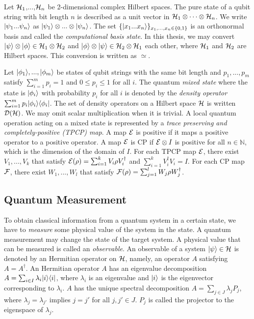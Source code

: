 Let $\mathcal{H}_1$,...,$\mathcal{H}_n$ be 2-dimensional complex Hilbert spaces.
The pure state of a qubit string with bit length $n$ is described as a
unit vector in $\mathcal{H}_1 \otimes \cdots \otimes \mathcal{H}_n$.
We write $|\psi_1...\psi_n\rangle$ as $|\psi_1\rangle \otimes...\otimes
|\psi_n\rangle$.
The set $\{|x_1...x_n\rangle\}_{x_1,...,x_n \in \{0,1\}}$ is 
an orthonormal basis and
called the \emph{computational basis state}.
In this thesis, we may convert
$|\psi\rangle \otimes |\phi\rangle \in \mathcal{H}_1 \otimes \mathcal{H}_2$ and 
$|\phi\rangle \otimes |\psi\rangle \in \mathcal{H}_2 \otimes \mathcal{H}_1$ each other,
where $\mathcal{H}_1$ and
$\mathcal{H}_2$ are Hilbert spaces. This conversion is written as $\simeq$.

Let $|\phi_1\rangle,...,|\phi_m\rangle$ be states of qubit strings with the
same bit length and $p_1,...,p_m$ satisfy $\sum_{i=1}^{m}p_i = 1$
and $0 \le p_i \le 1$ for all $i$. The quantum {\it mixed state} where the
state is $|\phi_i\rangle$ with probability $p_i$ for all $i$ is
denoted by the {\it density operator} $\sum_{i=1}^m
p_i|\phi_i\rangle\langle \phi_i|$. The set of density operators on 
a Hilbert space $\mathcal{H}$ is written $\mathcal{D}(\mathcal{H})$.
We may omit scalar multiplication when it is trivial.
A local quantum 
operation acting on a mixed state is represented by a 
\emph{trace preserving and completely-positive (TPCP) map}.
A map $\mathcal{E}$ is positive if it maps a positive operator to a
positive operator.
A map $\mathcal{E}$ is CP if $\mathcal{E} \otimes I$ is positive
for all $n \in \mathbb{N}$, which is the dimension of the domain of $I$.
For each TPCP map $\mathcal{E}$,
there exist $V_1,...,V_k$ that satisfy $\mathcal{E}(\rho) = \sum_{i=1}^{k} V_i
\rho V_i^\dagger$ and $\sum_{i=1}^{k}V_i^\dagger V_i =I$.
For each CP map $\mathcal{F}$,
there exist $W_1,...,W_l$ that satisfy $\mathcal{F}(\rho) = \sum_{j=1}^{l} W_j
\rho W_j^\dagger$.

\subsection*{Quantum Measurement}
To obtain classical information from a quantum system in a certain state,
we have to
\emph{measure} some physical value of the system in the state. A quantum
measurement may change the state of the target system.
A physical value that can be measured is called an \emph{observable}.
An observable of a system $|\psi\rangle \in \mathcal{H}$
is denoted by an Hermitian operator on $\mathcal{H}$, namely,
an operator $A$ satisfying $A = A^\dagger$.
An Hermitian operator $A$ has an eigenvalue decomposition
$A = \sum_{i \in I} \lambda_i |i\rangle\langle i|$, where $\lambda_i$ is an
eigenvalue and $|i\rangle$ is the eigenvector corresponding to $\lambda_i$.
$A$ has the unique spectral decomposition $A = \sum_{j \in J}
\lambda_j P_j$, where $\lambda_j = \lambda_{j'}$ implies $j = j'$
for all $j, j' \in J$. $P_j$ is called the projector to the 
eigenspace of $\lambda_j$.

